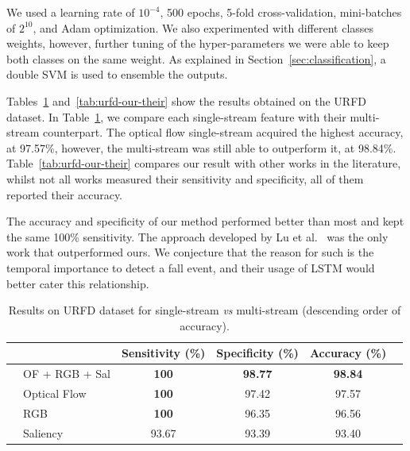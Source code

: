 \documentclass[10pt, conference, compsocconf]{IEEEtran}
\begin{document}
We used a learning rate of $10^{−4}$, 500 epochs, 5-fold cross-validation, mini-batches of $2^{10}$, and Adam optimization. We also experimented with different classes weights, however, further tuning of the hyper-parameters we were able to keep both classes on the same weight. As explained in Section~\ref{sec:classification}, a double SVM is used to ensemble the outputs.

Tables~\ref{tab:urfd-ensem} and~\ref{tab:urfd-our-their} show the results obtained on the URFD dataset. In Table~\ref{tab:urfd-ensem}, we compare each single-stream feature with their multi-stream counterpart. The optical flow single-stream acquired the highest accuracy, at 97.57\%, however, the multi-stream was still able to outperform it, at 98.84\%. Table~\ref{tab:urfd-our-their} compares our result with other works in the literature, whilst not all works measured their sensitivity and specificity, all of them reported their accuracy.

The accuracy and specificity of our method performed better than most and kept the same 100\% sensitivity. The approach developed by Lu et al.~\cite{lu2018deep} was the only work that outperformed ours. We conjecture that the reason for such is the temporal importance to detect a fall event, and their usage of LSTM would better cater this relationship.

\begin{table}[!htb]
\centering
\caption{Results on URFD dataset for single-stream \textit{vs} multi-stream (descending order of accuracy).}
\label{tab:urfd-ensem}
\begin{tabular}{llcccl}
\hline
 &  & Sensitivity (\%) & Specificity (\%) & Accuracy (\%) &  \\ \hline
 & OF + RGB + Sal & \textbf{100} & \textbf{98.77} & \textbf{98.84} &  \\
 & Optical Flow & \textbf{100} & 97.42 & 97.57 &  \\
 & RGB & \textbf{100} & 96.35 & 96.56 &  \\
 & Saliency & 93.67 & 93.39 & 93.40 &  \\ \hline
\end{tabular}
\end{table}
\end{document}
